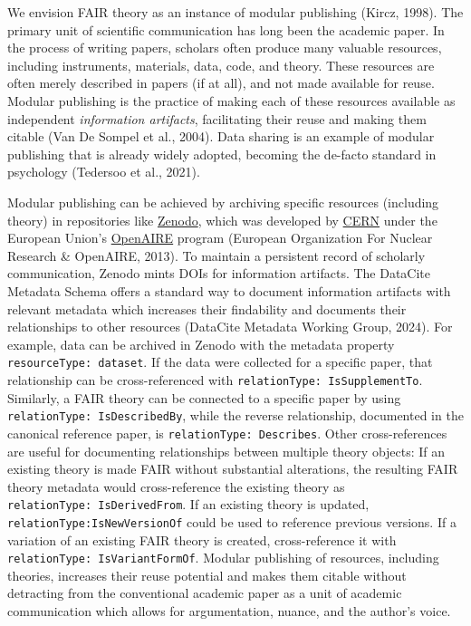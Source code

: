 \documentclass[
  man, noextraspace,floatsintext]{apa7}
\begin{document}
We envision FAIR theory as an instance of modular publishing (Kircz, 1998).
\label{modularvalue}{The primary unit of scientific communication has long been the academic paper.
In the process of writing papers, scholars often produce many valuable resources, including instruments, materials, data, code, and theory.
These resources are often merely described in papers (if at all), and not made available for reuse.
Modular publishing is the practice of making each of these resources available as independent \emph{information artifacts},
facilitating their reuse and making them citable (Van De Sompel et al., 2004).}
\label{datasharing}{Data sharing is an example of modular publishing that is already widely adopted, becoming the de-facto standard in psychology (Tedersoo et al., 2021).}

Modular publishing can be achieved by archiving specific resources (including theory) in repositories like \href{https://zenodo.org/}{Zenodo},
which was developed by \href{https://home.cern/}{CERN} under the European Union's \href{https://www.openaire.eu/}{OpenAIRE} program (European Organization For Nuclear Research \& OpenAIRE, 2013).
To maintain a persistent record of scholarly communication,
Zenodo mints DOIs for information artifacts.
The DataCite Metadata Schema offers a standard way to document information artifacts with relevant metadata which increases their findability and documents their relationships to other resources (DataCite Metadata Working Group, 2024).
For example, data can be archived in Zenodo with the metadata property \texttt{resourceType:\ dataset}.
If the data were collected for a specific paper, that relationship can be cross-referenced with \texttt{relationType:\ IsSupplementTo}.
Similarly, a FAIR theory can be connected to a specific paper by using \texttt{relationType:\ IsDescribedBy}, while the reverse relationship, documented in the canonical reference paper, is \texttt{relationType:\ Describes}.
Other cross-references are useful for documenting relationships between multiple theory objects: If an existing theory is made FAIR without substantial alterations,
the resulting FAIR theory metadata would cross-reference the existing theory as \texttt{relationType:\ IsDerivedFrom}.
If an existing theory is updated, \texttt{relationType:IsNewVersionOf} could be used to reference previous versions.
If a variation of an existing FAIR theory is created, cross-reference it with \texttt{relationType:\ IsVariantFormOf}.
\label{modularpublisingdetract}{Modular publishing of resources, including theories, increases their reuse potential and makes them citable without detracting from the conventional academic paper as a unit of academic communication which allows for argumentation,
nuance,
and the author's voice.
}
\end{document}
